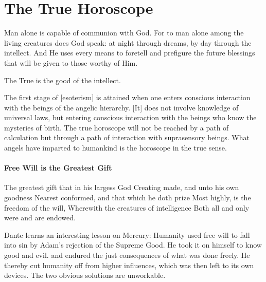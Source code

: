\section{The True Horoscope}

\begin{quotationx}
Man alone is capable of communion with God. For to man alone among the living creatures does God speak: at night through
dreams, by day through the intellect. And He uses every means to foretell and prefigure the future blessings that will
be given to those worthy of Him. 

The True is the good of the intellect. 

The first stage of [esoterism] is attained when one enters conscious interaction with the beings of the angelic
hierarchy. [It] does not involve knowledge of universal laws, but entering conscious interaction with the beings who
know the mysteries of birth. The true horoscope will not be reached by a path of calculation but through a path of
interaction with suprasensory beings. What angels have imparted to humankind is the horoscope in the true sense. 

\end{quotationx}

\paragraph{Free Will is the Greatest Gift}
\begin{quotex}
The greatest gift that in his largess God\newline
Creating made, and unto his own goodness\newline
Nearest conformed, and that which he doth prize\newline
Most highly, is the freedom of the will,\newline
Wherewith the creatures of intelligence\newline
Both all and only were and are endowed. 

\end{quotex}

Dante learns an interesting lesson on Mercury: Humanity used free will to fall into sin by Adam's rejection
of the Supreme Good. He took it on himself to know good and evil. and endured the just consequences of what was done
freely. He thereby cut humanity off from higher influences, which was then left to its own devices. The two obvious
solutions are unworkable.

